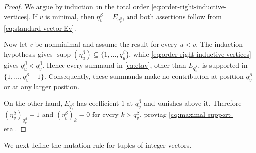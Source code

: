 \documentclass[12pt, reqno]{amsart}
\theoremstyle{plain}
\theoremstyle{definition}
\numberwithin{equation}{section}
\begin{document}
\begin{proof}
    We argue by induction on the total order
    \eqref{eq:order-right-inductive-vertices}. If \(v\) is minimal,
    then \(\eta_v^\beta=E_{q_v^\beta}\), and both assertions follow from
    \eqref{eq:standard-vector-Ev}.

    Now let \(v\) be nonminimal and assume the result for every
    \(u<v\). The induction hypothesis gives
    \(\operatorname{supp}(\eta_u^\beta)
      \subseteq\{1,\ldots,q_u^\beta\}\), while
    \eqref{eq:order-right-inductive-vertices} gives
    \(q_u^\beta<q_v^\beta\). Hence every summand in
    \eqref{eq:etav}, other than \(E_{q_v^\beta}\), is supported in
    \(\{1,\ldots,q_v^\beta-1\}\). Consequently, these summands make
    no contribution at position \(q_v^\beta\) or at any larger
    position.

    On the other hand, \(E_{q_v^\beta}\) has coefficient \(1\) at
    \(q_v^\beta\) and vanishes above it. Therefore
    \((\eta_v^\beta)_{q_v^\beta}=1\) and
    \((\eta_v^\beta)_k=0\) for every \(k>q_v^\beta\), proving
    \eqref{eq:maximal-support-eta}.
\end{proof}


We next define the mutation rule for tuples of integer vectors.
\end{document}
